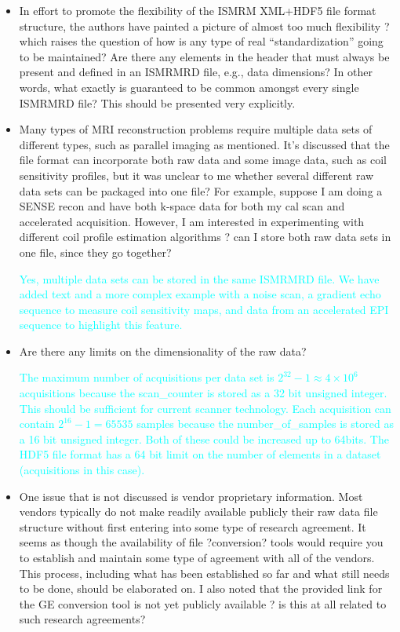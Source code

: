 \documentclass[12pt, draft]{article}
\makeatletter
\def\namedlabel#1#2{\begingroup#2\def\@currentlabel{#2}\phantomsection\label{#1}\endgroup}
\newcommand{\question}[1]{\item[\namedlabel{q#1}{#1}]}
\newcommand{\response}[1]{\textcolor{cyan}{#1}}
\makeatother
\begin{document}
{\begin{itemize}
\question{R1.2} In effort to promote the flexibility of the ISMRM XML+HDF5 file format structure, the authors have painted a picture of almost too much flexibility ? which raises the question of how is any type of real ``standardization'' going to be maintained? Are there any elements in the header that must always be present and defined in an ISMRMRD file, e.g., data dimensions? In other words, what exactly is guaranteed to be common amongst every single ISMRMRD file? This should be presented very explicitly.

\question{R1.3} Many types of MRI reconstruction problems require multiple data sets of different types, such as parallel imaging as mentioned. It's discussed that the file format can incorporate both raw data and some image data, such as coil sensitivity profiles, but it was unclear to me whether several different raw data sets can be packaged into one file? For example, suppose I am doing a SENSE recon and have both k-space data for both my cal scan and accelerated acquisition. However, I am interested in experimenting with different coil profile estimation algorithms ? can I store both raw data sets in one file, since they go together?

\response{Yes, multiple data sets can be stored in the same ISMRMRD file.  We have added text and a more complex example with a noise scan, a gradient echo sequence to measure coil sensitivity maps, and data from an accelerated EPI sequence to highlight this feature.}

\question{R1.4} Are there any limits on the dimensionality of the raw data?

\response{The maximum number of acquisitions per data set is $2^{32} - 1 \approx 4\times10^6$ acquisitions because the scan\_counter is stored as a 32 bit unsigned integer.  This should be sufficient for current scanner technology.  Each acquisition can contain $2^{16} - 1 = 65535$ samples because the number\_of\_samples is stored as a 16 bit unsigned integer.  Both of these could be increased up to 64bits.  The HDF5 file format has a 64 bit limit on the number of elements in a dataset (acquisitions in this case).}

\question{R1.5} One issue that is not discussed is vendor proprietary information. Most vendors typically do not make readily available publicly their raw data file structure without first entering into some type of research agreement. It seems as though the availability of file ?conversion? tools would require you to establish and maintain some type of agreement with all of the vendors. This process, including what has been established so far and what still needs to be done, should be elaborated on. I also noted that the provided link for the GE conversion tool is not yet publicly available ? is this at all related to such research agreements?


\end{itemize}}
\end{document}

